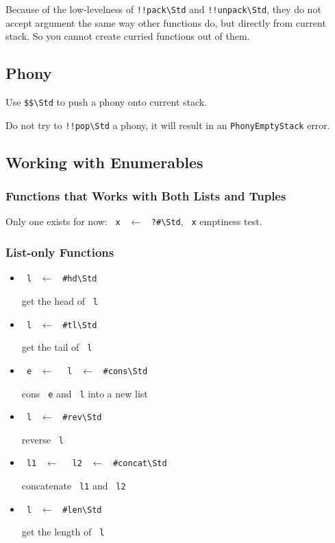 \documentclass{report}
\newcommand{\mstd}[1]{\texttt{#1\textbackslash Std}}
\newcommand{\mtilde}[1]{\textasciitilde}
\newcommand{\marg}[1]{\texttt{\mtilde ~#1}}
\newcommand{\mla}[0]{~$\leftarrow$ ~}
\begin{document}
\begin{mdframed}[style=hint]
  Because of the low-levelness of \mstd{!!pack} and \mstd{!!unpack}, they do not accept argument the same way other functions do, but directly from current stack. So you cannot create curried functions out of them.
\end{mdframed}

\subsection{Phony}

Use \mstd{\$\$} to push a phony onto current stack.

\begin{mdframed}[style=warning]
  Do not try to \mstd{!!pop} a phony, it will result in an \texttt{PhonyEmptyStack} error.
\end{mdframed}

\subsection{Working with Enumerables}


\subsubsection{Functions that Works with Both Lists and Tuples}

Only one exists for now: \marg{x} \mla \mstd{?\#}, \marg{x} emptiness test.

\subsubsection{List-only Functions}

\begin{itemize}
\item \marg{l} \mla \mstd{\#hd}

get the head of \marg{l}
\item \marg{l} \mla \mstd{\#tl}

get the tail of \marg{l}
\item \marg{e} \mla \marg{l} \mla \mstd{\#cons}

cons \marg{e} and \marg{l} into a new list
\item \marg{l} \mla \mstd{\#rev}

reverse \marg{l}
\item \marg{l1} \mla \marg{l2} \mla \mstd{\#concat}

concatenate \marg{l1} and \marg{l2}
\item \marg{l} \mla \mstd{\#len}

get the length of \marg{l}
\end{itemize}
\end{document}

